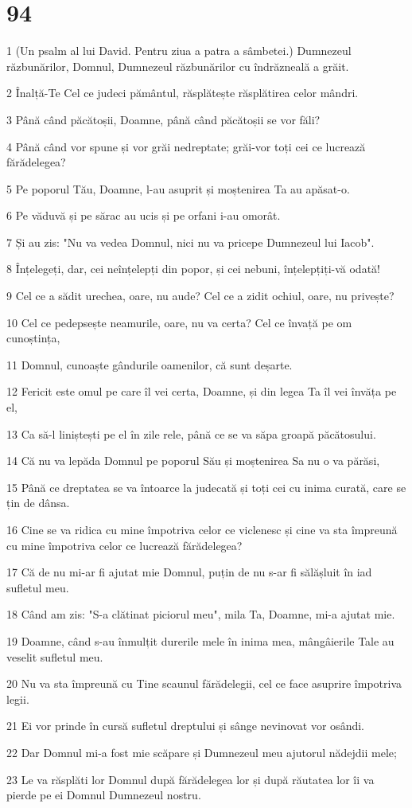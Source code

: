 \chapter{94}

\par 1 (Un psalm al lui David. Pentru ziua a patra a sâmbetei.) Dumnezeul răzbunărilor, Domnul, Dumnezeul răzbunărilor cu îndrăzneală a grăit.
\par 2 Înalță-Te Cel ce judeci pământul, răsplătește răsplătirea celor mândri.
\par 3 Până când păcătoșii, Doamne, până când păcătoșii se vor făli?
\par 4 Până când vor spune și vor grăi nedreptate; grăi-vor toți cei ce lucrează fărădelegea?
\par 5 Pe poporul Tău, Doamne, l-au asuprit și moștenirea Ta au apăsat-o.
\par 6 Pe văduvă și pe sărac au ucis și pe orfani i-au omorât.
\par 7 Și au zis: "Nu va vedea Domnul, nici nu va pricepe Dumnezeul lui Iacob".
\par 8 Înțelegeți, dar, cei neînțelepți din popor, și cei nebuni, înțelepțiți-vă odată!
\par 9 Cel ce a sădit urechea, oare, nu aude? Cel ce a zidit ochiul, oare, nu privește?
\par 10 Cel ce pedepsește neamurile, oare, nu va certa? Cel ce învață pe om cunoștința,
\par 11 Domnul, cunoaște gândurile oamenilor, că sunt deșarte.
\par 12 Fericit este omul pe care îl vei certa, Doamne, și din legea Ta îl vei învăța pe el,
\par 13 Ca să-l liniștești pe el în zile rele, până ce se va săpa groapă păcătosului.
\par 14 Că nu va lepăda Domnul pe poporul Său și moștenirea Sa nu o va părăsi,
\par 15 Până ce dreptatea se va întoarce la judecată și toți cei cu inima curată, care se țin de dânsa.
\par 16 Cine se va ridica cu mine împotriva celor ce viclenesc și cine va sta împreună cu mine împotriva celor ce lucrează fărădelegea?
\par 17 Că de nu mi-ar fi ajutat mie Domnul, puțin de nu s-ar fi sălășluit în iad sufletul meu.
\par 18 Când am zis: "S-a clătinat piciorul meu", mila Ta, Doamne, mi-a ajutat mie.
\par 19 Doamne, când s-au înmulțit durerile mele în inima mea, mângâierile Tale au veselit sufletul meu.
\par 20 Nu va sta împreună cu Tine scaunul fărădelegii, cel ce face asuprire împotriva legii.
\par 21 Ei vor prinde în cursă sufletul dreptului și sânge nevinovat vor osândi.
\par 22 Dar Domnul mi-a fost mie scăpare și Dumnezeul meu ajutorul nădejdii mele;
\par 23 Le va răsplăti lor Domnul după fărădelegea lor și după răutatea lor îi va pierde pe ei Domnul Dumnezeul nostru.

